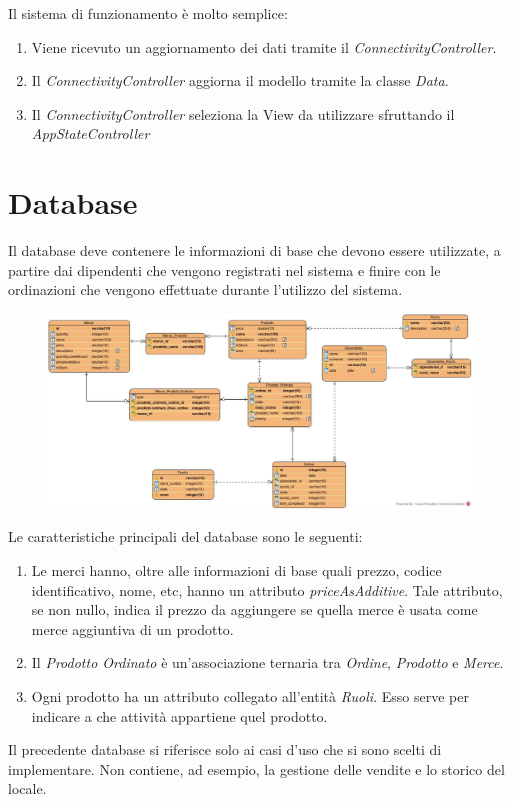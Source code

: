 Il sistema di funzionamento è molto semplice:
\begin{enumerate}
	\item Viene ricevuto un aggiornamento dei dati tramite il \textit{ConnectivityController}.
	\item Il \textit{ConnectivityController} aggiorna il modello tramite la classe \textit{Data}.
	\item Il \textit{ConnectivityController} seleziona la View da utilizzare sfruttando il \textit{AppStateController}
\end{enumerate}

\section{Database}
Il database deve contenere le informazioni di base che devono essere utilizzate, a partire dai dipendenti che vengono registrati nel sistema e finire con le ordinazioni che vengono effettuate durante l'utilizzo del sistema.
\begin{figure}[H]
	\centering
	\includegraphics[width=1\textwidth]{Immagini/database.jpg}
\end{figure}
Le caratteristiche principali del database sono le seguenti:
\begin{enumerate}
	\item Le merci hanno, oltre alle informazioni di base quali prezzo, codice identificativo, nome, etc, hanno un attributo \textit{priceAsAdditive}. Tale attributo, se non nullo, indica il prezzo da aggiungere se quella merce è usata come merce aggiuntiva di un prodotto.
	\item Il \textit{Prodotto Ordinato} è un'associazione ternaria tra \textit{Ordine}, \textit{Prodotto} e \textit{Merce}.
	 \item Ogni prodotto ha un attributo collegato all'entità \textit{Ruoli}. Esso serve per indicare a che attività appartiene quel prodotto.
\end{enumerate}
Il precedente database si riferisce solo ai casi d'uso che si sono scelti di implementare. Non contiene, ad esempio, la gestione delle vendite e lo storico del locale.

